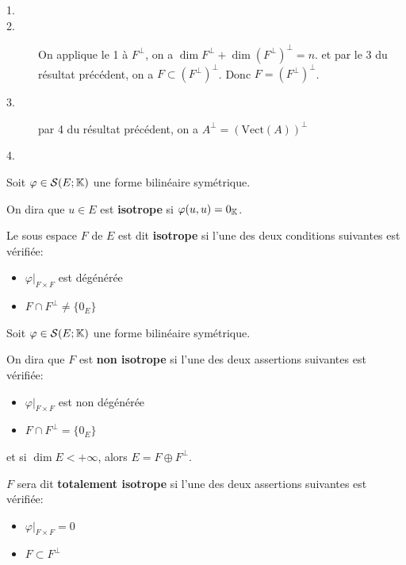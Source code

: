 \documentclass[a4paper,12pt]{article}
\begin{document}
\begin{demonstration}
    \begin{description}
        \item[1.]
        
        \item[2.]
        On applique le 1 à $F^\perp$, on a $\dim F^\perp + \dim (F^\perp)^\perp = n$.
        et par le 3 du résultat précédent, on a $F \subset (F^\perp)^\perp$.
        Donc $F = (F^\perp)^\perp$.
        
        \item[3.]
        par 4 du résultat précédent, on a $A^\perp = (\text{Vect}(A))^\perp$
        
        \item[4.]
    \end{description}
\end{demonstration}

\begin{definition}[(Isotropie)]
    Soit $\varphi \in \mathcal{S}(E; \mathbb{K})$ une forme bilinéaire symétrique.
    
    On dira que $u \in E$ est \textbf{isotrope} si $\varphi(u, u) = 0_{\mathbb{K}}$.

    Le sous espace $F$ de $E$ est dit \textbf{isotrope} si l'une des deux conditions suivantes est vérifiée:
    \begin{itemize}
        \item $\varphi|_{F \times F}$ est dégénérée
        \item $F \cap F^\perp \neq \{0_E\}$
    \end{itemize}
\end{definition}

\begin{definition}
    Soit $\varphi \in \mathcal{S}(E; \mathbb{K})$ une forme bilinéaire symétrique.

    On dira que $F$ est \textbf{non isotrope} si l'une des deux assertions suivantes est vérifiée:
    \begin{itemize}
        \item $\varphi|_{F \times F}$ est non dégénérée
        \item $F \cap F^\perp = \{0_E\}$
    \end{itemize}

    et si $\dim E < +\infty$, alors $E = F \oplus F^\perp$.

    $F$ sera dit \textbf{totalement isotrope} si l'une des deux assertions suivantes est vérifiée:
    \begin{itemize}
        \item $\varphi|_{F \times F} = 0$
        \item $F \subset F^\perp$
    \end{itemize}
\end{definition}
\end{document}
